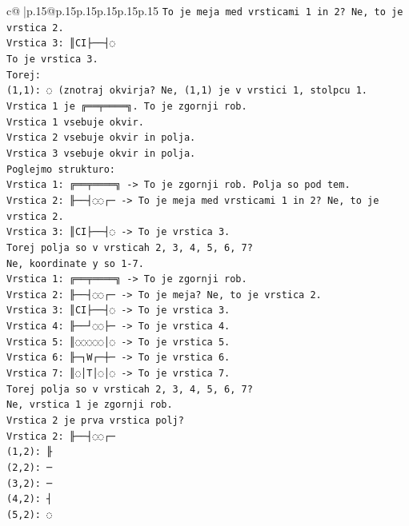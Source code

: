 \documentclass{article}
\begin{document}
{\begin{supertabular}{c@{$\;$}|p{.15\linewidth}@{}p{.15\linewidth}p{.15\linewidth}p{.15\linewidth}p{.15\linewidth}p{.15\linewidth}}
{{{\texttt{To je meja med vrsticami 1 in 2? Ne, to je vrstica 2.} \\
\texttt{Vrstica 3: ║CI├──┤◌} \\
\texttt{To je vrstica 3.} \\
\texttt{Torej:} \\
\texttt{(1,1): ◌ (znotraj okvirja? Ne, (1,1) je v vrstici 1, stolpcu 1. Vrstica 1 je ╔══╤════╗. To je zgornji rob.} \\
\texttt{Vrstica 1 vsebuje okvir.} \\
\texttt{Vrstica 2 vsebuje okvir in polja.} \\
\texttt{Vrstica 3 vsebuje okvir in polja.} \\
\texttt{Poglejmo strukturo:} \\
\texttt{Vrstica 1: ╔══╤════╗ {-}> To je zgornji rob. Polja so pod tem.} \\
\texttt{Vrstica 2: ╟──┤◌◌┌─ {-}> To je meja med vrsticami 1 in 2? Ne, to je vrstica 2.} \\
\texttt{Vrstica 3: ║CI├──┤◌ {-}> To je vrstica 3.} \\
\texttt{Torej polja so v vrsticah 2, 3, 4, 5, 6, 7?} \\
\texttt{Ne, koordinate y so 1{-}7.} \\
\texttt{Vrstica 1: ╔══╤════╗ {-}> To je zgornji rob.} \\
\texttt{Vrstica 2: ╟──┤◌◌┌─ {-}> To je meja? Ne, to je vrstica 2.} \\
\texttt{Vrstica 3: ║CI├──┤◌ {-}> To je vrstica 3.} \\
\texttt{Vrstica 4: ╟──┘◌◌├─ {-}> To je vrstica 4.} \\
\texttt{Vrstica 5: ║◌◌◌◌◌│◌ {-}> To je vrstica 5.} \\
\texttt{Vrstica 6: ╟─┐W┌─┼─ {-}> To je vrstica 6.} \\
\texttt{Vrstica 7: ║◌│T│◌│◌ {-}> To je vrstica 7.} \\
\texttt{Torej polja so v vrsticah 2, 3, 4, 5, 6, 7?} \\
\texttt{Ne, vrstica 1 je zgornji rob.} \\
\texttt{Vrstica 2 je prva vrstica polj?} \\
\texttt{Vrstica 2: ╟──┤◌◌┌─} \\
\texttt{(1,2): ╟} \\
\texttt{(2,2): ─} \\
\texttt{(3,2): ─} \\
\texttt{(4,2): ┤} \\
\texttt{(5,2): ◌} \\
}}}
\end{supertabular}}
\end{document}
